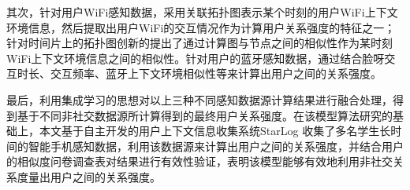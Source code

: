 \begin{cabstract}
\par 其次，针对用户WiFi感知数据，采用关联拓扑图表示某个时刻的用户WiFi上下文环境信息，然后提取出用户WiFi的交互情况作为计算用户关系强度的特征之一；针对时间片上的拓扑图创新的提出了通过计算图与节点之间的相似性作为某时刻WiFi上下文环境信息之间的相似性。针对用户的蓝牙感知数据，通过结合脸呀交互时长、交互频率、蓝牙上下文环境相似性等来计算出用户之间的关系强度。\\
\par 最后，利用集成学习的思想对以上三种不同感知数据源计算结果进行融合处理，得到基于不同非社交数据源所计算得到的最终用户关系强度。在该模型算法研究的基础上，本文基于自主开发的用户上下文信息收集系统StarLog 收集了多名学生长时间的智能手机感知数据，利用该数据源来计算出用户之间的关系强度，并结合用户的相似度问卷调查表对结果进行有效性验证，表明该模型能够有效地利用非社交关系度量出用户之间的关系强度。
\end{cabstract}

